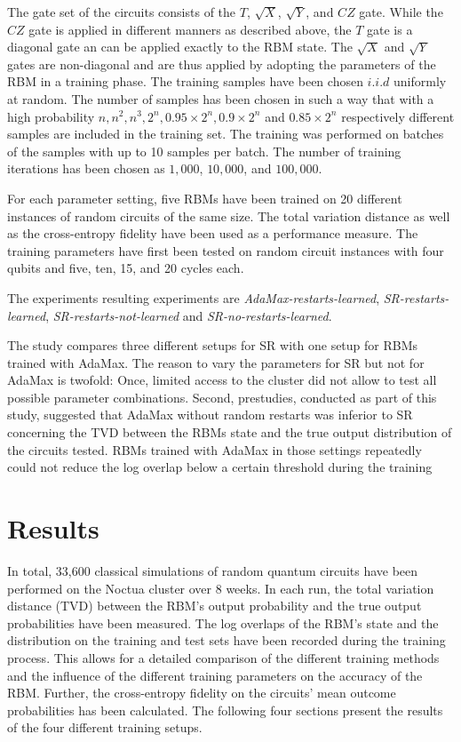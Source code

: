 The gate set of the circuits consists of the $T$, $\sqrt{X}$, $\sqrt{Y}$, and $CZ$ gate. While the $CZ$ gate is 
applied in different manners as described above, the $T$ gate is a diagonal gate an can be applied exactly to the RBM state.
The $\sqrt{X}$ and $\sqrt{Y}$ gates are non-diagonal and are thus applied by adopting the parameters of the RBM in 
a training phase. The training samples have been chosen $i.i.d$ uniformly at random. The number of samples has been chosen 
in such a way that with a high probability $n, n^2, n^3, 2^n, 0.95 \times 2^n, 0.9 \times 2^n$ and $0.85 \times 2^n$ 
respectively different samples are included in the training set. The training was performed on batches of the samples with 
up to 10 samples per batch.
The number of training iterations has been chosen as $1,000$, $10,000$, and $100,000$. 

For each parameter setting, five RBMs have been trained on 20 different instances of random circuits of the same 
size. The total variation distance as well as the cross-entropy fidelity have been used as a performance measure.
The training parameters have first been tested on random circuit instances with four qubits and 
five, ten, 15, and 20 cycles each. 

The experiments resulting experiments are \textit{AdaMax-restarts-learned}, \textit{SR-restarts-learned}, 
\textit{SR-restarts-not-learned} and \textit{SR-no-restarts-learned}. 

The study compares three different setups for SR with one setup for RBMs trained with 
AdaMax. The reason to vary the parameters for SR but not for AdaMax is twofold:
Once, limited access to the cluster did not allow to test all possible parameter combinations. Second,
prestudies, conducted as part of this study, suggested that AdaMax without random restarts 
was inferior to SR concerning the TVD between the RBMs state and the true output distribution of the 
circuits tested. RBMs trained with AdaMax in those settings repeatedly could not reduce the 
log overlap below a certain threshold during the training

\section{Results}

In total, 33,600 classical simulations of random quantum circuits have been performed 
on the Noctua cluster over 8 weeks. In each run, the total variation distance (TVD)
between the RBM's output probability and the true output probabilities have been measured.
 The log overlaps of the RBM's state and the distribution on the training and test sets have been recorded during the training process. This allows for a detailed comparison
of the different training methods and the influence of the different training parameters on the 
accuracy of the RBM. Further, the cross-entropy fidelity on the circuits' mean outcome probabilities
has been calculated. The following four sections present the results of the four different training setups.

